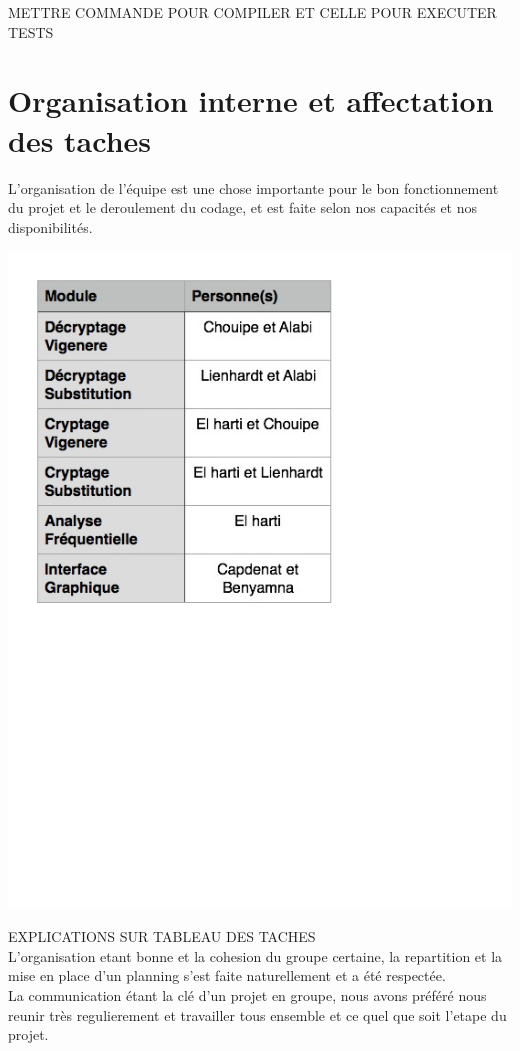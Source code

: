 \documentclass[a4]{article}
\begin{document}
		METTRE COMMANDE POUR COMPILER ET CELLE POUR EXECUTER TESTS
	\section{Organisation interne et affectation des taches}
	L'organisation de l'équipe est une chose importante pour le bon fonctionnement du
projet et le deroulement du codage, et est faite selon nos capacités et nos disponibilités.  \\ 
		 \begin{center}\includegraphics[scale=0.5]{tableau_tache_final.jpg}\end{center}
		 EXPLICATIONS SUR TABLEAU DES TACHES \\ 
		
		L'organisation etant bonne et la cohesion du groupe certaine, la repartition et la mise en place d'un planning 
		s'est faite naturellement et a été respectée.  \\
		La communication étant la clé d'un projet en groupe, nous avons préféré
		 nous reunir très regulierement et travailler tous ensemble et ce quel que soit l'etape du projet.
\end{document}

